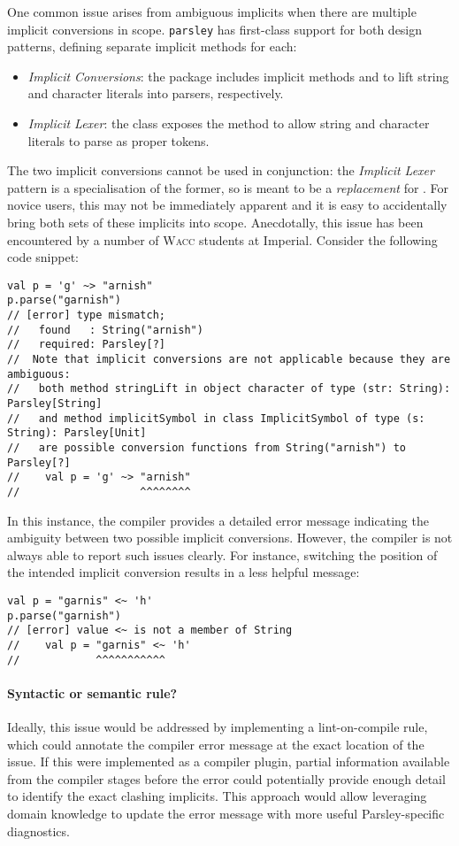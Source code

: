 \documentclass[../../main.tex]{subfiles}
\begin{document}
One common issue arises from ambiguous implicits when there are multiple implicit conversions in scope.
\texttt{parsley} has first-class support for both design patterns, defining separate implicit methods for each:
\begin{itemize}
  \item \emph{Implicit Conversions}: the  package includes implicit methods  and  to lift string and character literals into parsers, respectively.
  \item \emph{Implicit Lexer}: the  class exposes the  method to allow string and character literals to parse as proper tokens.
\end{itemize}
%
The two implicit conversions cannot be used in conjunction: the \emph{Implicit Lexer} pattern is a specialisation of the former, so  is meant to be a \emph{replacement} for .
For novice users, this may not be immediately apparent and it is easy to accidentally bring both sets of these implicits into scope.
Anecdotally, this issue has been encountered by a number of \textsc{Wacc} students at Imperial.
Consider the following code snippet:
\begin{verbatim}
val p = 'g' ~> "arnish"
p.parse("garnish")
// [error] type mismatch;
//   found   : String("arnish")
//   required: Parsley[?]
//  Note that implicit conversions are not applicable because they are ambiguous:
//   both method stringLift in object character of type (str: String): Parsley[String]
//   and method implicitSymbol in class ImplicitSymbol of type (s: String): Parsley[Unit]
//   are possible conversion functions from String("arnish") to Parsley[?]
//    val p = 'g' ~> "arnish"
//                   ^^^^^^^^
\end{verbatim}
%
In this instance, the compiler provides a detailed error message indicating the ambiguity between two possible implicit conversions.
However, the compiler is not always able to report such issues clearly. For instance, switching the position of the intended implicit conversion results in a less helpful message:
\begin{verbatim}
val p = "garnis" <~ 'h'
p.parse("garnish")
// [error] value <~ is not a member of String
//    val p = "garnis" <~ 'h'
//            ^^^^^^^^^^^
\end{verbatim}

\paragraph{Syntactic or semantic rule?}
Ideally, this issue would be addressed by implementing a lint-on-compile rule, which could annotate the compiler error message at the exact location of the issue.
If this were implemented as a compiler plugin, partial information available from the compiler stages before the error could potentially provide enough detail to identify the exact clashing implicits.
This approach would allow leveraging domain knowledge to update the error message with more useful Parsley-specific diagnostics.
\end{document}
